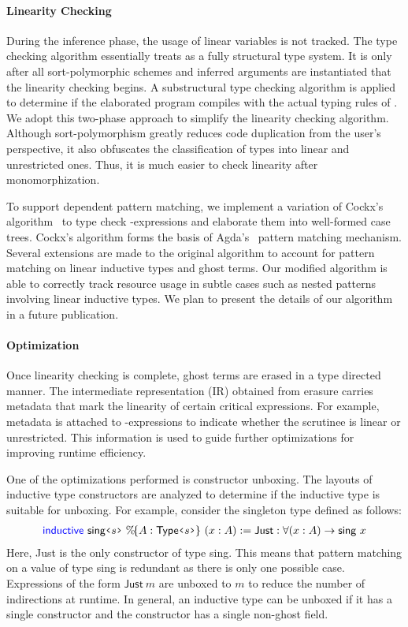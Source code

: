 \paragraph{\textbf{Linearity Checking}}
During the inference phase, the usage of linear variables is not tracked. The
type checking algorithm essentially treats \TLLC{} as a fully structural type
system. It is only after all sort-polymorphic schemes and inferred arguments are
instantiated that the linearity checking begins. A substructural type checking
algorithm is applied to determine if the elaborated program compiles with the actual
typing rules of \TLLC{}. We adopt this two-phase approach to simplify the linearity
checking algorithm. Although sort-polymorphism greatly reduces code duplication from
the user's perspective, it also obfuscates the classification of types into linear
and unrestricted ones. Thus, it is much easier to check linearity after monomorphization.

To support dependent pattern matching, we implement a variation of 
Cockx's algorithm~\cite{cockx18} to type check \Match{}-expressions and elaborate them
into well-formed case trees. Cockx's algorithm forms the basis of Agda's~\cite{agda}
pattern matching mechanism. Several extensions are made to the original algorithm to
account for pattern matching on linear inductive types and ghost terms. Our modified
algorithm is able to correctly track resource usage in subtle cases such as nested
patterns involving linear inductive types. We plan to present the details of our
algorithm in a future publication.

\paragraph{\textbf{Optimization}}
Once linearity checking is complete, ghost terms are erased in a type directed
manner.  The intermediate representation (IR) obtained from erasure carries
metadata that mark the linearity of certain critical expressions. For example,
metadata is attached to \Match{}-expressions to indicate whether the scrutinee
is linear or unrestricted. This information is used to guide further
optimizations for improving runtime efficiency.

One of the optimizations performed is constructor unboxing. The layouts of inductive type
constructors are analyzed to determine if the inductive type is suitable for unboxing.
For example, consider the singleton type defined as follows:
\begin{align*}
  \Inductive\ \textsf{sing}\flq{s}\frq\ \%\!\{A : \textsf{Type}\flq{s}\frq\}\ (x : A) := 
  \textsf{Just} : \forall (x : A) \rightarrow \textsf{sing}\ x
\end{align*}
Here, \textsf{Just} is the only constructor of type \textsf{sing}. This means that
pattern matching on a value of type \textsf{sing} is redundant as there is only one possible case.
Expressions of the form $\textsf{Just}\ m$ are unboxed to $m$ to reduce the number of indirections
at runtime. In general, an inductive type can be unboxed if it has a single constructor and
the constructor has a single non-ghost field.

